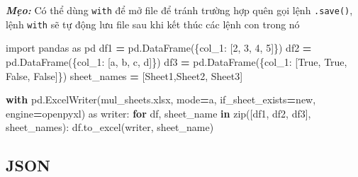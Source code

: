 \documentclass[
]{book}
\makeatletter
\newenvironment{Shaded}{\begin{snugshade}}{\end{snugshade}}
\newcommand{\BuiltInTok}[1]{#1}
\newcommand{\ControlFlowTok}[1]{\textcolor[rgb]{0.13,0.29,0.53}{\textbf{#1}}}
\newcommand{\DecValTok}[1]{\textcolor[rgb]{0.00,0.00,0.81}{#1}}
\newcommand{\ImportTok}[1]{#1}
\newcommand{\KeywordTok}[1]{\textcolor[rgb]{0.13,0.29,0.53}{\textbf{#1}}}
\newcommand{\NormalTok}[1]{#1}
\newcommand{\OperatorTok}[1]{\textcolor[rgb]{0.81,0.36,0.00}{\textbf{#1}}}
\newcommand{\StringTok}[1]{\textcolor[rgb]{0.31,0.60,0.02}{#1}}
\newcommand{\VariableTok}[1]{\textcolor[rgb]{0.00,0.00,0.00}{#1}}
\newenvironment{kframe}{%
\medskip{}
\setlength{\fboxsep}{.8em}
 \def\at@end@of@kframe{}%
 \ifinner\ifhmode%
  \def\at@end@of@kframe{\end{minipage}}%
  \begin{minipage}{\columnwidth}%
 \fi\fi%
 \def\FrameCommand##1{\hskip\@totalleftmargin \hskip-\fboxsep
 \colorbox{shadecolor}{##1}\hskip-\fboxsep
     \hskip-\linewidth \hskip-\@totalleftmargin \hskip\columnwidth}%
 \MakeFramed {\advance\hsize-\width
   \@totalleftmargin\z@ \linewidth\hsize
   \@setminipage}}%
 {\par\unskip\endMakeFramed%
 \at@end@of@kframe}
\newenvironment{rmdblock}[1]
  {
  \begin{itemize}
  \renewcommand{\labelitemi}{
    \raisebox{-.7\height}[0pt][0pt]{
      {\setkeys{Gin}{width=3em,keepaspectratio}\texttt{[image: images/\#1]}}
    }
  }
  \setlength{\fboxsep}{1em}
  \begin{kframe}
  \item
  }
  {
  \end{kframe}
  \end{itemize}
  }
\newenvironment{rmdtip}
  {\begin{rmdblock}{tip}}
  {\end{rmdblock}}
\makeatother
\begin{document}
\begin{rmdtip}
\textbf{\emph{Mẹo:}}
Có thể dùng \texttt{with} để mở file để tránh trường hợp quên gọi lệnh \texttt{.save()}, lệnh \texttt{with} sẽ tự động lưu file sau khi kết thúc các lệnh con trong nó
\end{rmdtip}

\begin{Shaded}
\begin{Highlighting}[]
\ImportTok{import}\NormalTok{ pandas }\ImportTok{as}\NormalTok{ pd}
\NormalTok{df1 }\OperatorTok{=}\NormalTok{ pd.DataFrame(\{}\StringTok{\textquotesingle{}col\_1\textquotesingle{}}\NormalTok{: [}\DecValTok{2}\NormalTok{, }\DecValTok{3}\NormalTok{, }\DecValTok{4}\NormalTok{, }\DecValTok{5}\NormalTok{]\})}
\NormalTok{df2 }\OperatorTok{=}\NormalTok{ pd.DataFrame(\{}\StringTok{\textquotesingle{}col\_1\textquotesingle{}}\NormalTok{: [}\StringTok{\textquotesingle{}a\textquotesingle{}}\NormalTok{, }\StringTok{\textquotesingle{}b\textquotesingle{}}\NormalTok{, }\StringTok{\textquotesingle{}c\textquotesingle{}}\NormalTok{, }\StringTok{\textquotesingle{}d\textquotesingle{}}\NormalTok{]\})}
\NormalTok{df3 }\OperatorTok{=}\NormalTok{ pd.DataFrame(\{}\StringTok{\textquotesingle{}col\_1\textquotesingle{}}\NormalTok{: [}\VariableTok{True}\NormalTok{, }\VariableTok{True}\NormalTok{, }\VariableTok{False}\NormalTok{, }\VariableTok{False}\NormalTok{]\})}
\NormalTok{sheet\_names }\OperatorTok{=}\NormalTok{ [}\StringTok{\textquotesingle{}Sheet1\textquotesingle{}}\NormalTok{,}\StringTok{\textquotesingle{}Sheet2\textquotesingle{}}\NormalTok{, }\StringTok{\textquotesingle{}Sheet3\textquotesingle{}}\NormalTok{]}

\ControlFlowTok{with}\NormalTok{ pd.ExcelWriter(}\StringTok{\textquotesingle{}mul\_sheets.xlsx\textquotesingle{}}\NormalTok{, mode}\OperatorTok{=}\StringTok{\textquotesingle{}a\textquotesingle{}}\NormalTok{, if\_sheet\_exists}\OperatorTok{=}\StringTok{\textquotesingle{}new\textquotesingle{}}\NormalTok{, engine}\OperatorTok{=}\StringTok{\textquotesingle{}openpyxl\textquotesingle{}}\NormalTok{) }\ImportTok{as}\NormalTok{ writer:}
    \ControlFlowTok{for}\NormalTok{ df, sheet\_name }\KeywordTok{in} \BuiltInTok{zip}\NormalTok{([df1, df2, df3], sheet\_names):}
\NormalTok{        df.to\_excel(writer, sheet\_name)}
\end{Highlighting}
\end{Shaded}

\subsection{JSON}\label{json}
\end{document}
